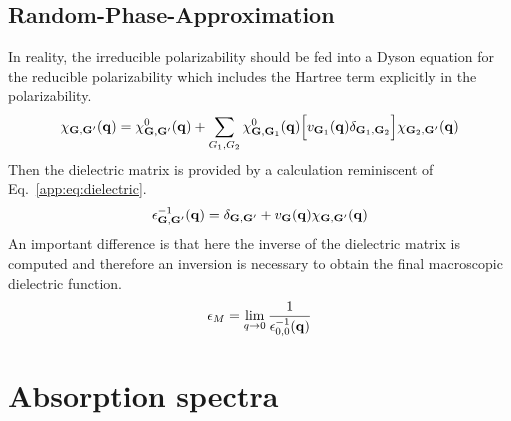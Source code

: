 \subsection{Random-Phase-Approximation}
In reality, the irreducible polarizability should be fed into a Dyson equation for the reducible polarizability which includes the Hartree term explicitly in the polarizability.
\begin{align}
    \chi_{\mathbf{G},\mathbf{G}'}(\mathbf{q})=\chi^0_{\mathbf{G},\mathbf{G}'}(\mathbf{q})+\sum_{G_1,G_2}\chi^0_{\mathbf{G},\mathbf{G}_1}(\mathbf{q})\Big[v_{\mathbf{G}_1}(\mathbf{q})\delta_{\mathbf{G}_1,\mathbf{G}_2}\Big]\chi_{\mathbf{G}_2,\mathbf{G}'}(\mathbf{q})
\end{align}
Then the dielectric matrix is provided by a calculation reminiscent of Eq.~\ref{app:eq:dielectric}.
\begin{align}
    \epsilon^{-1}_{\mathbf{G},\mathbf{G}'}(\mathbf{q})=
    \delta_{\mathbf{G},\mathbf{G}'}+v_{\mathbf{G}}(\mathbf{q})\chi_{\mathbf{G},\mathbf{G}'}(\mathbf{q})
\end{align}
An important difference is that here the inverse of the dielectric matrix is computed and therefore an inversion is necessary to obtain the final macroscopic dielectric function.
\begin{align}
    \epsilon_{M}=\lim_{q\rightarrow 0} \frac{1}{\epsilon^{-1}_{0,0}(\mathbf{q})}
\end{align}


\section{Absorption spectra}

